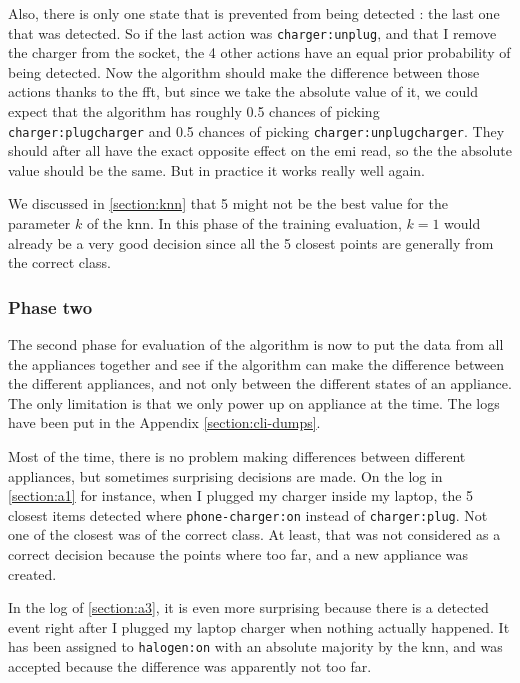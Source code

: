 Also, there is only one state that is prevented from being detected : the last one that was detected. So if the last action was \texttt{charger:unplug}, and that I remove the charger from the socket, the 4 other actions have an equal prior probability of being detected. Now the algorithm should make the difference between those actions thanks to the \acrshort{fft}, but since we take the absolute value of it, we could expect that the algorithm has roughly 0.5 chances of picking \texttt{charger:plugcharger} and 0.5 chances of picking \texttt{charger:unplugcharger}. They should after all have the exact opposite effect on the \acrshort{emi} read, so the the absolute value should be the same. But in practice it works really well again.

We discussed in \autoref{section:knn} that 5 might not be the best value for the parameter $k$ of the \acrshort{knn}. In this phase of the training evaluation, $k=1$ would already be a very good decision since all the 5 closest points are generally from the correct class.

\subsubsection{Phase two}
The second phase for evaluation of the algorithm is now to put the data from all the appliances together and see if the algorithm can make the difference between the different appliances, and not only between the different states of an appliance. The only limitation is that we only power up on appliance at the time. The logs have been put in the Appendix \ref{section:cli-dumps}.

Most of the time, there is no problem making differences between different appliances, but sometimes surprising decisions are made. On the log in \autoref{section:a1} for instance, when I plugged my charger inside my laptop, the 5 closest items detected where \texttt{phone-charger:on} instead of \texttt{charger:plug}. Not one of the closest was of the correct class. At least, that was not considered as a correct decision because the points where too far, and a new appliance was created. 

In the log of \autoref{section:a3}, it is even more surprising because there is a detected event right after I plugged my laptop charger when nothing actually happened. It has been assigned to \texttt{halogen:on} with an absolute majority by the \acrshort{knn}, and was accepted because the difference was apparently not too far.

